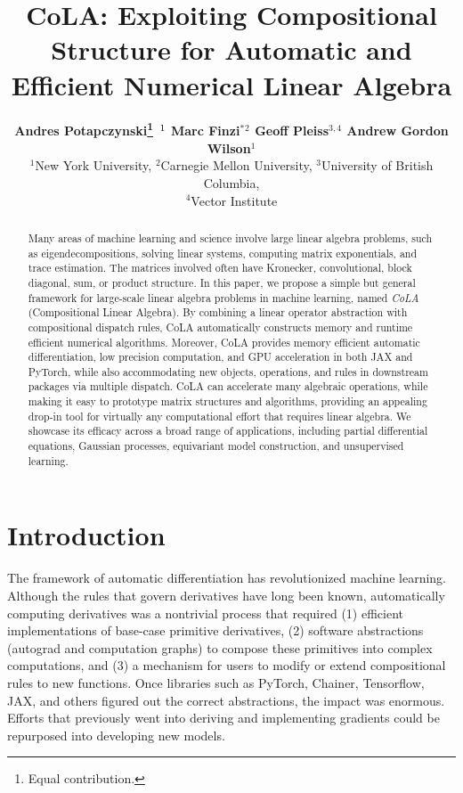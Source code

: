 \documentclass{article}
\title{CoLA: Exploiting Compositional Structure for Automatic and Efficient Numerical Linear Algebra}
\author{
\normalsize
  \textbf{Andres Potapczynski\thanks{Equal contribution.}$\text{\,\,\,}^1$
  \enspace
  Marc Finzi$^*$$^2$
  \enspace
  Geoff Pleiss$^{3, 4}$
  \enspace
  Andrew Gordon Wilson$^1$} \\
\normalsize
$^1$New York University, $^2$Carnegie Mellon University, $^3$University of British Columbia, \\ $^4$Vector Institute \\
}
\begin{document}
\maketitle

\begin{abstract}
\noindent Many areas of machine learning and science involve large linear algebra problems, such as eigendecompositions, solving linear systems, computing matrix exponentials, and trace estimation. The matrices involved often have Kronecker, convolutional, block diagonal, sum, or product structure. In this paper, we propose a simple but general framework for large-scale linear algebra problems in machine learning, named \emph{CoLA} (Compositional Linear Algebra). By combining a linear operator abstraction with compositional dispatch rules, CoLA automatically constructs memory and runtime efficient numerical algorithms. Moreover, CoLA provides memory efficient automatic differentiation, low precision computation, and GPU acceleration in both JAX and PyTorch, while also accommodating new objects, operations, and rules in downstream packages via multiple dispatch. CoLA can accelerate many algebraic operations, while making it easy to prototype matrix structures and algorithms, providing an appealing drop-in tool for virtually any computational effort that requires linear algebra. We showcase its efficacy across a broad range of applications, including partial differential equations, Gaussian processes, equivariant model construction, and unsupervised learning.
\end{abstract}


\section{Introduction}

The framework of automatic differentiation has revolutionized machine learning.
Although the rules that govern derivatives have long been known, automatically computing derivatives was a nontrivial process that required
(1) efficient implementations of base-case primitive derivatives,
(2) software abstractions (autograd and computation graphs) to compose these primitives into complex computations, and
(3) a mechanism for users to modify or extend compositional rules to new functions.
Once libraries such as PyTorch, Chainer, Tensorflow, JAX, and others
\citep{tensorflow2015-whitepaper,jax2018github,maclaurin2016modeling,maclaurin2015gradient,paszke2019pytorch,tokui2015chainer}
figured out the correct abstractions, the impact was enormous.
Efforts that previously went into deriving and implementing gradients could be repurposed into developing new models.
\end{document}
